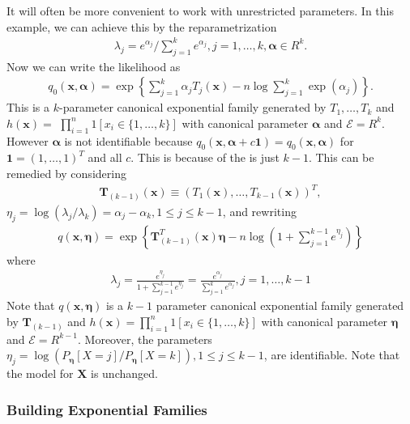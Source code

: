 \documentclass{article}
\begin{document}
\begin{exma}
  It will often be more convenient to work with unrestricted parameters. In this example, we can achieve this by the reparametrization
\begin{align*}
\lambda_{j}=e^{\alpha_{j}} / \sum_{j=1}^{k} e^{\alpha_{j}}, j=1, \ldots, k, \boldsymbol{\alpha} \in R^{k} .
\end{align*}
Now we can write the likelihood as
\begin{align*}
q_{0}(\mathbf{x}, \boldsymbol{\alpha})=\exp \left\{\sum_{j=1}^{k} \alpha_{j} T_{j}(\mathbf{x})-n \log \sum_{j=1}^{k} \exp \left(\alpha_{j}\right)\right\} .
\end{align*}
This is a $k$-parameter canonical exponential family generated by $T_{1}, \ldots, T_{k}$ and $h(\mathbf{x})=$ $\prod_{i=1}^{n} 1\left[x_{i} \in\{1, \ldots, k\}\right]$ with canonical parameter $\boldsymbol{\alpha}$ and $\mathcal{E}=R^{k}$. However $\boldsymbol{\alpha}$ is not identifiable because $q_{0}(\mathbf{x}, \boldsymbol{\alpha}+c \mathbf{1})=q_{0}(\mathbf{x}, \boldsymbol{\alpha})$ for $\mathbf{1}=(1, \ldots, 1)^{T}$ and all $c$. This is because of the  is just $k-1$. This can be remedied by considering
\begin{align*}
\mathbf{T}_{(k-1)}(\mathbf{x}) \equiv\left(T_{1}(\mathbf{x}), \ldots, T_{k-1}(\mathbf{x})\right)^{T},
\end{align*}
$\eta_{j}=\log \left(\lambda_{j} / \lambda_{k}\right)=\alpha_{j}-\alpha_{k}, 1 \leq j \leq k-1$, and rewriting
\begin{align*}
q(\mathbf{x}, \boldsymbol{\eta})=\exp \left\{\mathbf{T}_{(k-1)}^{T}(\mathbf{x}) \boldsymbol{\eta}-n \log \left(1+\sum_{j=1}^{k-1} e^{\eta_{j}}\right)\right\}
\end{align*}
where
\begin{align*}
\lambda_{j}=\frac{e^{\eta_{j}}}{1+\sum_{j=1}^{k-1} e^{\eta_{j}}}=\frac{e^{\alpha_{j}}}{\sum_{j=1}^{k} e^{\alpha_{j}}}, j=1, \ldots, k-1
\end{align*}
Note that $q(\mathbf{x}, \boldsymbol{\eta})$ is a $k-1$ parameter canonical exponential family generated by $\mathbf{T}_{(k-1)}$ and $h(\mathbf{x})=\prod_{i=1}^{n} 1\left[x_{i} \in\{1, \ldots, k\}\right]$ with canonical parameter $\boldsymbol{\eta}$ and $\mathcal{E}=R^{k-1} .$ Moreover, the parameters $\eta_{j}=\log \left(P_{\boldsymbol{\eta}}[X=j] / P_{\boldsymbol{\eta}}[X=k]\right), 1 \leq j \leq k-1$, are identifiable. Note that the model for $\mathbf{X}$ is unchanged.
\end{exma}
\subsubsection{Building Exponential Families}\label{sec:bef}
\end{document}
